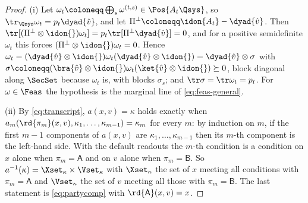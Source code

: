 \begin{proof}
(i) Let $\omega_t\coloneqq\bigoplus_s\omega^{(t,s)}\in\Pos{A_t\Qsys}$, so
$\tr_{\Qsys}\omega_t=p_t\dyad{\hat v}$, and let
$\Pi^{\perp}\coloneqq\idon{A_t}-\dyad{\hat v}$. Then
$\tr[(\Pi^{\perp}\otimes\idon{})\omega_t]=p_t\tr[\Pi^{\perp}\dyad{\hat v}]=0$,
and for a positive semidefinite $\omega_t$ this forces
$(\Pi^{\perp}\otimes\idon{})\omega_t=0$. Hence
$\omega_t=(\dyad{\hat v}\otimes\idon{})\omega_t(\dyad{\hat v}\otimes\idon{})
=\dyad{\hat v}\otimes\sigma$ with
$\sigma\coloneqq(\bra{\hat v}\otimes\idon{})\omega_t(\ket{\hat v}\otimes\idon{})
\succeq0$, block diagonal along $\SecSet$ because $\omega_t$ is, with blocks
$\sigma_s$; and $\tr\sigma=\tr\omega_t=p_t$. For $\omega\in\Feas$ the
hypothesis is the marginal line of \eqref{eq:feas-general}.

(ii) By \eqref{eq:transcript}, $a(x,v)=\kappa$ holds exactly when
$a_m(\rd{\pi_m}(x,v),\kappa_1,\dots,\kappa_{m-1})=\kappa_m$ for every $m$:
by induction on $m$, if the first $m-1$ components of $a(x,v)$ are
$\kappa_1,\dots,\kappa_{m-1}$ then its $m$-th component is the left-hand
side. With the default readouts the $m$-th condition is a condition on $x$
alone when $\pi_m=\mathsf A$ and on $v$ alone when $\pi_m=\mathsf B$. So
$a^{-1}(\kappa)=\Xset_{\kappa}\times\Vset_{\kappa}$ with $\Xset_{\kappa}$ the
set of $x$ meeting all conditions with $\pi_m=\mathsf A$ and
$\Vset_{\kappa}$ the set of $v$ meeting all those with $\pi_m=\mathsf B$. The
last statement is \eqref{eq:partycomp} with $\rd{\mathsf A}(x,v)=x$.


\end{proof}
